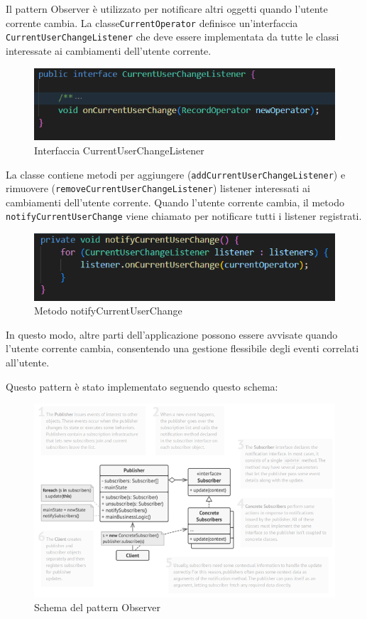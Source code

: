 Il pattern Observer è utilizzato per notificare altri oggetti quando l'utente corrente cambia. La classe\texttt{CurrentOperator} definisce un'interfaccia \texttt{CurrentUserChangeListener}
che deve essere implementata da tutte le classi interessate ai cambiamenti dell'utente corrente.
\begin{figure}[H]
    \centering
    \includegraphics[width=1\textwidth]{../../img/currentUserChangeListener.png}
    \caption{Interfaccia CurrentUserChangeListener}
    \label{fig:Observer 1}
\end{figure}
La classe contiene metodi per aggiungere (\texttt{addCurrentUserChangeListener}) e rimuovere (\texttt{removeCurrentUserChangeListener}) listener interessati ai cambiamenti dell'utente corrente.
Quando l'utente corrente cambia, il metodo \texttt{notifyCurrentUserChange} viene chiamato per notificare tutti i listener registrati.
\begin{figure}[H]
    \centering
    \includegraphics[width=1\textwidth]{../../img/notifyCurrentUserChange.png}
    \caption{Metodo notifyCurrentUserChange}
    \label{fig:Observer 2}
\end{figure}
In questo modo, altre parti dell'applicazione possono essere avvisate quando l'utente corrente cambia, consentendo una gestione flessibile degli eventi correlati all'utente.

Questo pattern è stato implementato seguendo questo schema:
\begin{figure}[H]
    \centering
    \includegraphics[width=1\textwidth]{../../img/schema_observer.png}
    \caption{Schema del pattern Observer}
    \label{fig:ObserverPattern}
\end{figure}
